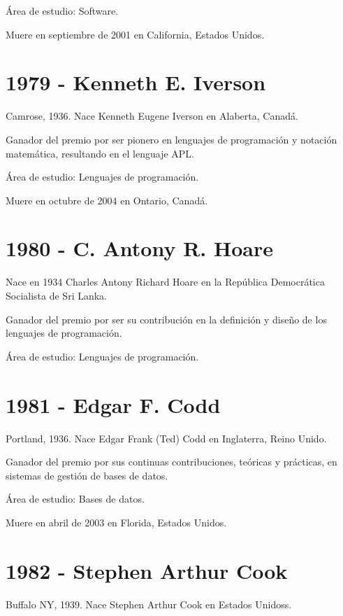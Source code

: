 \documentclass[notitlepage,letterpaper, 11pt]{article}
\begin{document}
\noindent Área de estudio: Software.

\noindent Muere en septiembre de 2001 en California, Estados Unidos.
\newline

\section*{1979 - Kenneth E. Iverson}
\noindent Camrose, 1936. Nace Kenneth Eugene Iverson en Alaberta, Canadá.

\noindent Ganador del premio por ser pionero en lenguajes de programación y notación matemática, resultando en el lenguaje APL.

\noindent Área de estudio: Lenguajes de programación.

\noindent Muere en octubre de 2004 en Ontario, Canadá.
\newline

\section*{1980 - C. Antony R. Hoare}
\noindent Nace en 1934 Charles Antony Richard Hoare en la República Democrática Socialista de Sri Lanka.

\noindent Ganador del premio por ser su contribución en la definición y diseño de los lenguajes de programación.

\noindent Área de estudio: Lenguajes de programación.
\newline

\section*{1981 - Edgar F. Codd}
\noindent Portland, 1936. Nace Edgar Frank (Ted) Codd en Inglaterra, Reino Unido.

\noindent Ganador del premio por sus continuas contribuciones, teóricas y prácticas, en sistemas de gestión de bases de datos. 

\noindent Área de estudio: Bases de datos.

\noindent Muere en abril de 2003 en Florida, Estados Unidos.
\newline

\section*{1982 - Stephen Arthur Cook}
\noindent Buffalo NY, 1939. Nace Stephen Arthur Cook en Estados Unidoss.
\end{document}
